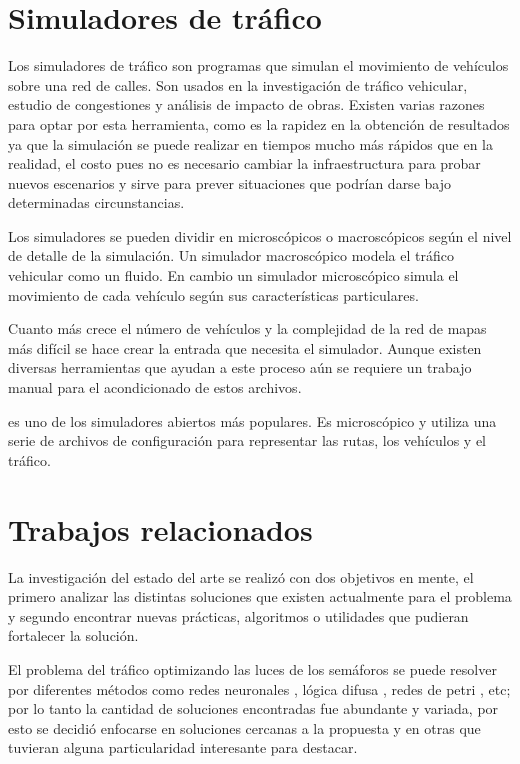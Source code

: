 \section{Simuladores de tráfico}

Los simuladores de tráfico son programas que simulan el movimiento de vehículos sobre una red de calles. Son usados en la investigación de tráfico vehicular, estudio de congestiones y análisis de impacto de obras.  Existen varias razones para optar por esta herramienta, como es la rapidez en la obtención de resultados ya que la simulación se puede realizar en tiempos mucho más rápidos que en la realidad, el costo pues no es necesario cambiar la infraestructura para probar nuevos escenarios y sirve para prever situaciones que podrían darse bajo determinadas circunstancias.

Los simuladores se pueden dividir en microscópicos o macroscópicos según el nivel de detalle de la simulación. Un simulador macroscópico modela  el tráfico vehicular como un fluido. En cambio un simulador microscópico simula el movimiento de cada vehículo según sus características particulares.

Cuanto más crece el número de vehículos y la complejidad de la red de mapas más difícil se hace crear la entrada que necesita el simulador. Aunque existen diversas herramientas que ayudan a este proceso aún se requiere un trabajo manual para el acondicionado de estos archivos.

\citet{SUMO} es uno de los simuladores abiertos más populares. Es microscópico y utiliza una serie de archivos de configuración para representar las rutas, los vehículos y el tráfico.  


\section{Trabajos relacionados}

La investigación del estado del arte se realizó con dos objetivos en mente, el primero analizar las distintas soluciones que existen actualmente para el problema y segundo encontrar nuevas prácticas, algoritmos o utilidades que pudieran fortalecer la solución.

El problema del tráfico optimizando las luces de los semáforos se puede resolver por diferentes métodos como  redes neuronales \citep{Lopez1999}, lógica difusa \citep{Lim2001}, redes de petri \citep{DiFebbraro2002}, etc; por lo tanto la cantidad de soluciones encontradas fue abundante y variada, por esto se decidió enfocarse en soluciones cercanas a la propuesta y en otras que tuvieran alguna particularidad interesante para destacar.


